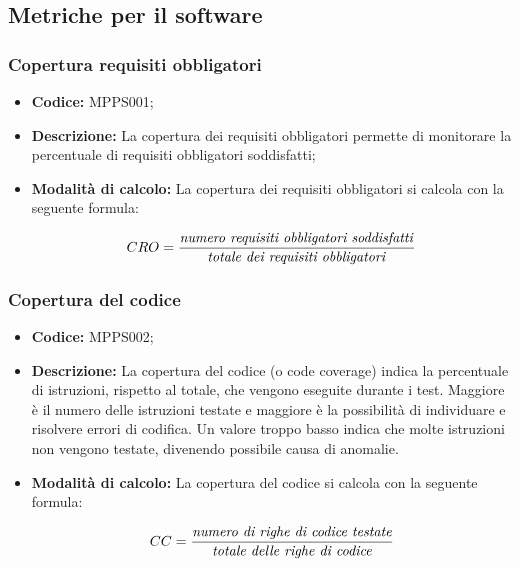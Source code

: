 \documentclass[../NormediProgetto.tex]{subfiles}
\begin{document}

\subsection{Metriche per il software}

\subsubsection{Copertura requisiti obbligatori}

\begin{itemize}
	\item \textbf{Codice:} MPPS001;
	\item \textbf{Descrizione:} La copertura dei requisiti obbligatori permette di monitorare la percentuale di requisiti obbligatori soddisfatti;
	\item \textbf{Modalità di calcolo:} La copertura dei requisiti obbligatori si calcola con la seguente formula:
	
	\[ CRO = \frac{\textrm{\textit{numero requisiti obbligatori soddisfatti}}}{\textrm{\textit{totale dei requisiti obbligatori}}} \]
\end{itemize}

\subsubsection{Copertura del codice}

\begin{itemize}
	
	\item \textbf{Codice:} MPPS002;
	
	\item \textbf{Descrizione:} La copertura del codice (o code coverage) indica la percentuale di istruzioni,  rispetto al totale, che vengono eseguite durante i test. Maggiore è il numero delle istruzioni testate e maggiore è la possibilità di individuare e risolvere errori di codifica. Un valore troppo basso indica che molte istruzioni non vengono testate, divenendo possibile causa di anomalie.
	
	\item \textbf{Modalità di calcolo:} La copertura del codice si calcola con la seguente formula:
	
	\[ CC = \frac{\textrm{\textit{numero di righe di codice testate}}}{\textrm{\textit{totale delle righe di codice}}} \]
\end{itemize}
\end{document}

